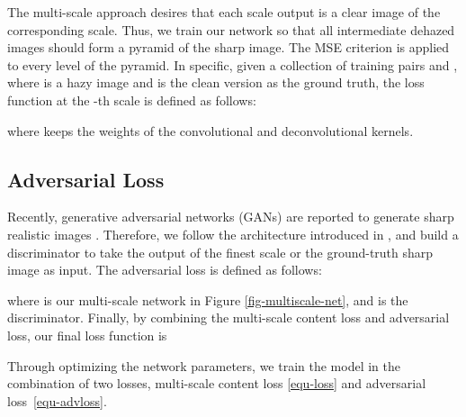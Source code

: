 \documentclass[10pt,twocolumn,letterpaper]{article}
\begin{document}
The multi-scale approach desires that each scale output is a clear image of the corresponding scale. Thus, we train our network so that all intermediate dehazed images should form a pyramid of the sharp image.
The MSE criterion is applied to every level of the pyramid.
In specific, given a collection of  training pairs  and , where  is a hazy image and  is the clean version as the ground truth, the loss function at the -th scale is defined as follows:

where  keeps the weights of the convolutional and deconvolutional kernels.

\subsection{Adversarial Loss}
Recently, generative adversarial networks (GANs) are reported to generate
sharp realistic images \cite{nah2017deep}. Therefore, we follow the architecture introduced in \cite{nah2017deep}, and build a discriminator to take the output of the finest scale or the ground-truth sharp image as input. The adversarial loss is defined as follows:

where  is our multi-scale network in Figure \ref{fig-multiscale-net}, and  is the discriminator.
Finally, by combining the multi-scale content loss and
adversarial loss, our final loss function is

Through optimizing the network parameters, we train the
model in the combination of two losses, multi-scale content
loss \eqref{equ-loss} and adversarial loss~\eqref{equ-advloss}.
\end{document}
